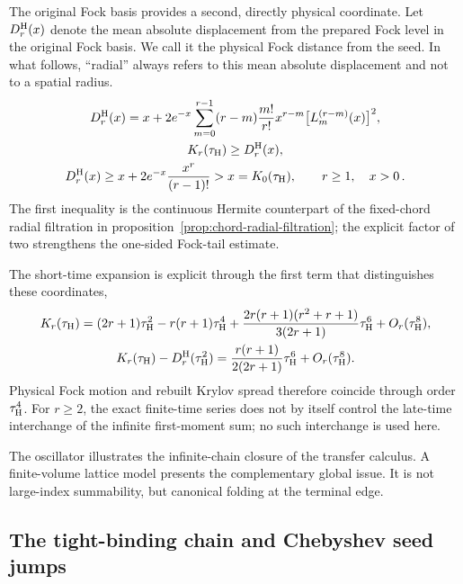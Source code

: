 \documentclass[a4paper,11pt]{article}
\def\ee{e}%
\theoremstyle{definition}
\theoremstyle{remark}
\newcommand{\ee}{\mathrm e}
\begin{document}
The original Fock basis provides a second, directly physical coordinate.
Let
$D_r^{\rm H}(x)$ denote the mean absolute displacement from the prepared Fock level in the
original Fock basis.  We call it the physical Fock distance from the seed.  In what follows,
``radial'' always refers to this mean absolute displacement and not to a spatial radius.
\begin{equation}
\begin{gathered}
   D_r^{\rm H}(x)
   =x+2\ee^{-x}\sum_{m=0}^{r-1}(r-m)\frac{m!}{r!}
      x^{r-m}\bigl[L_m^{(r-m)}(x)\bigr]^2,\\
   K_r(\tau_{\rm H})\ge D_r^{\rm H}(x),\\
   D_r^{\rm H}(x)
   \ge x+2\ee^{-x}\frac{x^r}{(r-1)!}>x=K_0(\tau_{\rm H}),
   \qquad r\ge1,\quad x>0\,.
\end{gathered}
   \label{eq:Hermite-radial-bound-main}
\end{equation}
The first inequality is the continuous Hermite counterpart of the fixed-chord radial filtration in
proposition~\ref{prop:chord-radial-filtration}; the explicit factor of two strengthens the
one-sided Fock-tail estimate.

The short-time expansion is explicit through the first term that distinguishes these coordinates,
\begin{equation}
\begin{gathered}
   K_r(\tau_{\rm H})
   =(2r+1)\tau_{\rm H}^2-r(r+1)\tau_{\rm H}^4
     +\frac{2r(r+1)(r^2+r+1)}{3(2r+1)}\tau_{\rm H}^6
     +O_r(\tau_{\rm H}^8),\\
   K_r(\tau_{\rm H})-D_r^{\rm H}(\tau_{\rm H}^2)
   =\frac{r(r+1)}{2(2r+1)}\tau_{\rm H}^6
     +O_r(\tau_{\rm H}^8).
   \label{eq:Hermite-all-r-short-time-main}
\end{gathered}
\end{equation}
Physical  Fock motion and rebuilt Krylov spread therefore coincide through order $\tau_{\rm H}^4$.
For $r\ge2$, the exact finite-time series does not by itself control the late-time interchange of
the infinite first-moment sum; no such interchange is used here.

The oscillator illustrates the infinite-chain closure of the transfer
calculus. %
A finite-volume lattice model presents the complementary global issue.  It is not large-index
summability, but canonical folding at the terminal edge.

\subsection{The tight-binding chain and Chebyshev seed jumps}
\label{subsec:tight-binding}
\end{document}
